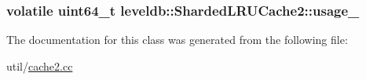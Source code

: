 \subsubsection[{usage\+\_\+}]{\setlength{\rightskip}{0pt plus 5cm}volatile {\bf uint64\+\_\+t} leveldb\+::\+Sharded\+L\+R\+U\+Cache2\+::usage\+\_\+}\label{classleveldb_1_1_sharded_l_r_u_cache2_a4a5ba487471eb7b7bfbd875281dfe4fe}


The documentation for this class was generated from the following file\+:\begin{DoxyCompactItemize}
\item 
util/\hyperlink{cache2_8cc}{cache2.\+cc}\end{DoxyCompactItemize}
